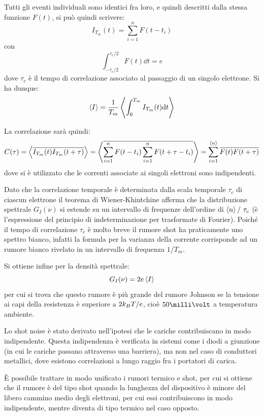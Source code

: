 Tutti gli eventi individuali sono identici fra loro, e quindi descritti dalla stessa funzione $ F(t) $, si può quindi scrivere:
\[ I_{T_m}(t) = \sum_{i =1}^n F(t-t_i) \]
con
\[ \int_{-\tau_c/2}^{\tau_c/2} F(t) \dd t = e \]
dove $ \tau_c $ è il tempo di correlazione associato al passaggio di un singolo elettrone. Si ha dunque:
\[ \expval{I} = \frac{1}{T_m} \expval{\int_{0}^{T_m} I_{T_m}(t) \dd t} \]

La correlazione sarà quindi:
\begin{align*}
C(\tau) = \expval{\overline{I_{T_m}(t) I_{T_m}(t + \tau)}} = \expval{\overline{\sum_{i =1}^n F(t-t_i) \sum_{i =1}^n F(t + \tau -t_i)}} = \sum_{i =1}^{\expval{n}} \overline{F(t) F(t + \tau)}
\end{align*}
dove si è utilizzato che le correnti associate ai singoli elettroni sono indipendenti.

Dato che la correlazione temporale è determinata dalla scala temporale $ \tau_c $ di ciascun elettrone il teorema di Wiener-Khintchine afferma che la distribuzione spettrale $ G_I(\nu) $ si estende su un intervallo di frequenze dell'ordine di $ \expval{n}/~\tau_c $ (è l'espressione del principio di indeterminazione per trasformate di Fourier).
Poiché il tempo di correlazione $ \tau_c $ è molto breve il rumore shot ha praticamente uno spettro bianco, infatti la formula per la varianza della corrente corrisponde ad un rumore bianco rivelato in un intervallo di frequenza $ 1/T_m $.

Si ottiene infine per la densità spettrale:
\[ G_I (\nu) = 2 e \expval{I} \]
per cui si trova che questo rumore è più grande del rumore Johnson se la tensione ai capi della resistenza è superiore a $ 2k_B T/e $, cioè $ 50 \milli\volt $ a temperatura ambiente.

\begin{oss}
	Lo shot noise è stato derivato nell'ipotesi che le cariche contribuiscano in modo indipendente. Questa indipendenza è verificata in sistemi come i diodi a giunzione (in cui le cariche passano attraverso una barriera), ma non nel caso di conduttori metallici, dove esistono correlazioni a lungo raggio fra i portatori di carica.
\end{oss}
\begin{oss}
	\`E possibile trattare in modo unificato i rumori termico e shot, per cui si ottiene che il rumore è del tipo shot quando la lunghezza del dispositivo è minore del libero cammino medio degli elettroni, per cui essi contribuiscono in modo indipendente, mentre diventa di tipo termico nel caso opposto.
\end{oss}

